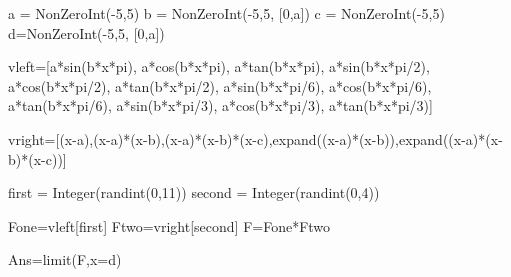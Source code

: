 

\begin{sagesilent}
a = NonZeroInt(-5,5)
b = NonZeroInt(-5,5, [0,a])
c = NonZeroInt(-5,5)
d=NonZeroInt(-5,5, [0,a])
   
vleft=[a*sin(b*x*pi), a*cos(b*x*pi), a*tan(b*x*pi), a*sin(b*x*pi/2), a*cos(b*x*pi/2), a*tan(b*x*pi/2), a*sin(b*x*pi/6), a*cos(b*x*pi/6), a*tan(b*x*pi/6), a*sin(b*x*pi/3), a*cos(b*x*pi/3), a*tan(b*x*pi/3)]

vright=[(x-a),(x-a)*(x-b),(x-a)*(x-b)*(x-c),expand((x-a)*(x-b)),expand((x-a)*(x-b)*(x-c))]

first = Integer(randint(0,11))
second = Integer(randint(0,4))

Fone=vleft[first]
Ftwo=vright[second]
F=Fone*Ftwo

Ans=limit(F,x=d)

\end{sagesilent}

